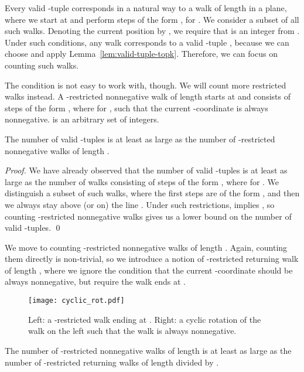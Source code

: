 \documentclass[runningheads]{llncs}
\begin{document}
Every valid -tuple  corresponds
in a natural way to a walk of length  in a plane, where we start
at  and perform steps of the form , for
.  We consider a subset of all such walks. Denoting
the current position by , we require that  is an
integer from . Under
such conditions, any walk corresponds to a valid -tuple
, because we can choose
 and apply
Lemma~\ref{lem:valid-tuple-topk}. Therefore, we can focus on counting
such walks.

The condition  is not
easy to work with, though. We will count more restricted walks
instead. A -restricted nonnegative walk of length  starts at
 and consists of  steps of the form , where
 for , such that the current
-coordinate is always nonnegative.  is an arbitrary set of
integers.

\begin{lemma}
\label{lem:restricted-walks-topk}
The number of valid -tuples is at least as large as the number
of -restricted nonnegative walks of length
.
\end{lemma}

\begin{proof}
We have already observed that the number of valid -tuples is at
least as large as the number of walks consisting of  steps of the
form , where  for
. We distinguish a subset of such walks, where the
first  steps are of the form , and then we always stay
above (or on) the line . Under such restrictions,  implies , so counting
-restricted nonnegative walks gives us a lower bound on
the number of valid -tuples.  \qed
\end{proof}

We move to counting -restricted nonnegative walks of length
. Again, counting them directly is non-trivial, so we introduce a
notion of -restricted returning walk of length , where we ignore
the condition that the current -coordinate should be always
nonnegative, but require the walk ends at .

\begin{figure}
\centering
\texttt{[image: cyclic\_rot.pdf]}
\caption{\label{fig:cyclic-rotation-topk}Left: a -restricted walk ending
  at . Right: a cyclic rotation of the walk on the left such
  that the walk is always nonnegative.}
\end{figure}

\begin{lemma}
\label{lem:cycle-lemma-topk}
The number of -restricted nonnegative walks of length  is at
least as large as the number of -restricted returning walks of
length  divided by .
\end{lemma}
\end{document}
